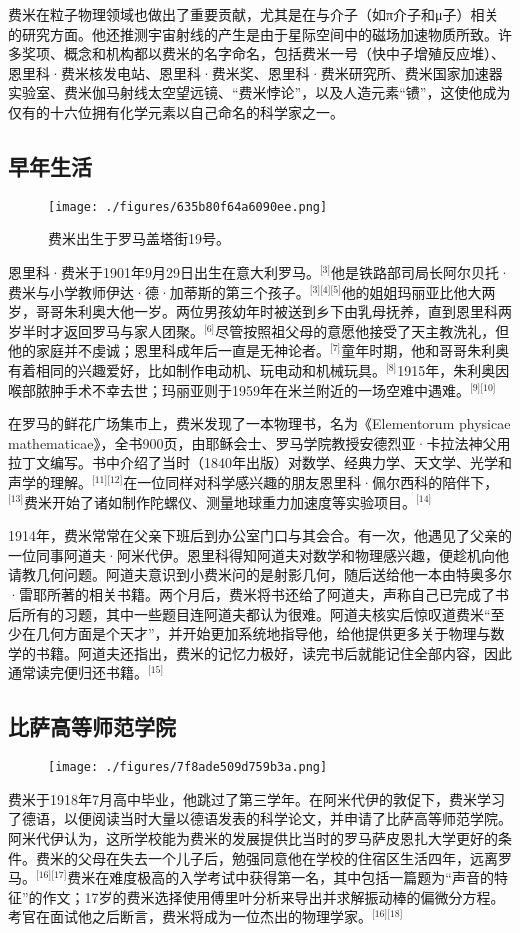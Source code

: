 费米在粒子物理领域也做出了重要贡献，尤其是在与介子（如π介子和μ子）相关的研究方面。他还推测宇宙射线的产生是由于星际空间中的磁场加速物质所致。许多奖项、概念和机构都以费米的名字命名，包括费米一号（快中子增殖反应堆）、恩里科·费米核发电站、恩里科·费米奖、恩里科·费米研究所、费米国家加速器实验室、费米伽马射线太空望远镜、“费米悖论”，以及人造元素“镄”，这使他成为仅有的十六位拥有化学元素以自己命名的科学家之一。
\subsection{早年生活}
\begin{figure}[ht]
\centering
\texttt{[image: ./figures/635b80f64a6090ee.png]}
\caption{费米出生于罗马盖塔街19号。} \label{fig_ELK_1}
\end{figure}
恩里科·费米于1901年9月29日出生在意大利罗马。\(^\text{[3]}\)他是铁路部司局长阿尔贝托·费米与小学教师伊达·德·加蒂斯的第三个孩子。\(^\text{[3][4][5]}\)他的姐姐玛丽亚比他大两岁，哥哥朱利奥大他一岁。两位男孩幼年时被送到乡下由乳母抚养，直到恩里科两岁半时才返回罗马与家人团聚。\(^\text{[6]}\)尽管按照祖父母的意愿他接受了天主教洗礼，但他的家庭并不虔诚；恩里科成年后一直是无神论者。\(^\text{[7]}\)童年时期，他和哥哥朱利奥有着相同的兴趣爱好，比如制作电动机、玩电动和机械玩具。\(^\text{[8]}\)1915年，朱利奥因喉部脓肿手术不幸去世；玛丽亚则于1959年在米兰附近的一场空难中遇难。\(^\text{[9][10]}\)

在罗马的鲜花广场集市上，费米发现了一本物理书，名为《Elementorum physicae mathematicae》，全书900页，由耶稣会士、罗马学院教授安德烈亚·卡拉法神父用拉丁文编写。书中介绍了当时（1840年出版）对数学、经典力学、天文学、光学和声学的理解。\(^\text{[11][12]}\)在一位同样对科学感兴趣的朋友恩里科·佩尔西科的陪伴下，\(^\text{[13]}\)费米开始了诸如制作陀螺仪、测量地球重力加速度等实验项目。\(^\text{[14]}\)

1914年，费米常常在父亲下班后到办公室门口与其会合。有一次，他遇见了父亲的一位同事阿道夫·阿米代伊。恩里科得知阿道夫对数学和物理感兴趣，便趁机向他请教几何问题。阿道夫意识到小费米问的是射影几何，随后送给他一本由特奥多尔·雷耶所著的相关书籍。两个月后，费米将书还给了阿道夫，声称自己已完成了书后所有的习题，其中一些题目连阿道夫都认为很难。阿道夫核实后惊叹道费米“至少在几何方面是个天才”，并开始更加系统地指导他，给他提供更多关于物理与数学的书籍。阿道夫还指出，费米的记忆力极好，读完书后就能记住全部内容，因此通常读完便归还书籍。\(^\text{[15]}\)
\subsection{比萨高等师范学院}
\begin{figure}[ht]
\centering
\texttt{[image: ./figures/7f8ade509d759b3a.png]}
\caption{} \label{fig_ELK_2}
\end{figure}
费米于1918年7月高中毕业，他跳过了第三学年。在阿米代伊的敦促下，费米学习了德语，以便阅读当时大量以德语发表的科学论文，并申请了比萨高等师范学院。阿米代伊认为，这所学校能为费米的发展提供比当时的罗马萨皮恩扎大学更好的条件。费米的父母在失去一个儿子后，勉强同意他在学校的住宿区生活四年，远离罗马。\(^\text{[16][17]}\)费米在难度极高的入学考试中获得第一名，其中包括一篇题为“声音的特征”的作文；17岁的费米选择使用傅里叶分析来导出并求解振动棒的偏微分方程。考官在面试他之后断言，费米将成为一位杰出的物理学家。\(^\text{[16][18]}\)

